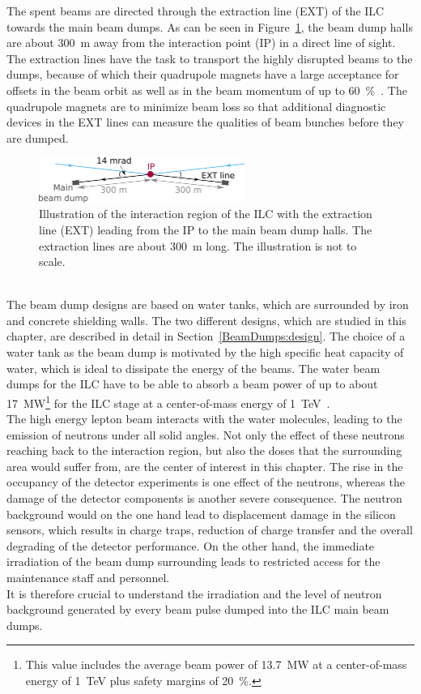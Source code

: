 The spent \positron\electron beams are directed through the extraction line (EXT) of the ILC towards the main beam dumps. 
As can be seen in Figure~\ref{fig:BeamDumps:IP_to_Dump}, the beam dump halls are about \SI{300}{\meter} away from the interaction point (IP) in a direct line of sight.
The extraction lines have the task to transport the highly disrupted beams to the dumps, because of which their quadrupole magnets have a large acceptance for offsets in the beam orbit as well as in the beam momentum of up to \SI{60}{\percent}~\cite[p. 139]{TDR32}.
The quadrupole magnets are to minimize beam loss so that additional diagnostic devices in the EXT lines can measure the qualities of beam bunches before they are dumped.
\begin{figure}
\centering
\includegraphics[width=0.6\textwidth]{Figures/BeamDump/IP_EXT.png}
\caption[Schematic of the ILC interaction region with extraction line]{Illustration of the interaction region of the ILC with the extraction line (EXT) leading from the IP to the main beam dump halls.
The extraction lines are about \SI[detect-all]{300}{\meter} long.
The illustration is not to scale.}
\label{fig:BeamDumps:IP_to_Dump}
\end{figure}
\\The beam dump designs are based on water tanks, which are surrounded by iron and concrete shielding walls. 
The two different designs, which are studied in this chapter, are described in detail in Section~\ref{BeamDumps:design}.
The choice of a water tank as the beam dump is motivated by the high specific heat capacity of water, which is ideal to dissipate the energy of the beams. 
The water beam dumps for the ILC have to be able to absorb a beam power of up to about \SI{17}{\mega\watt}\footnote{This value includes the average beam power of \SI{13.7}{\mega\watt} at a center-of-mass energy of \SI{1}{\TeV} plus safety margins of \SI{20}{\percent}.} for the ILC stage at a center-of-mass energy of \SI{1}{\TeV}~\cite{BeamDumpSpecs}.
\\The high energy lepton beam interacts with the water molecules, leading to the emission of neutrons under all solid angles. 
Not only the effect of these neutrons reaching back to the interaction region, but also the doses that the surrounding area would suffer from, are the center of interest in this chapter. 
The rise in the occupancy of the detector experiments is one effect of the neutrons, whereas the damage of the detector components is another severe consequence.
The neutron background would on the one hand lead to displacement damage in the silicon sensors, which results in charge traps, reduction of charge transfer and the overall degrading of the detector performance. 
On the other hand, the immediate irradiation of the beam dump surrounding leads to restricted access for the maintenance staff and personnel.
\\It is therefore crucial to understand the irradiation and the level of neutron background generated by every beam pulse dumped into the ILC main beam dumps.

